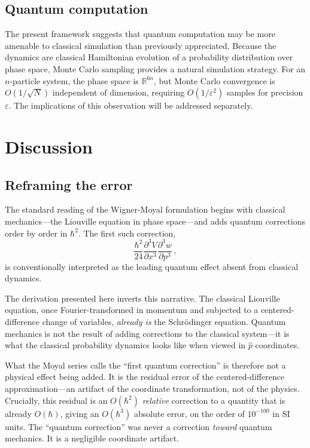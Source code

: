 \documentclass[prb,preprint]{revtex4-1}
\begin{document}
\subsection{Quantum computation}

The present framework suggests that quantum computation may be more amenable to classical simulation than previously appreciated.  Because the dynamics are classical Hamiltonian evolution of a probability distribution over phase space, Monte Carlo sampling provides a natural simulation strategy.  For an $n$-particle system, the phase space is $\mathbb{R}^{6n}$, but Monte Carlo convergence is $O(1/\sqrt{N})$ independent of dimension, requiring $O(1/\varepsilon^2)$ samples for precision $\varepsilon$.  The implications of this observation will be addressed separately.


\section{Discussion}

\subsection{Reframing the error}

The standard reading of the Wigner-Moyal formulation\cite{wigner1932,moyal1949} begins with classical mechanics---the Liouville equation in phase space---and adds quantum corrections order by order in $\hbar^2$.  The first such correction,
\begin{equation}\label{eq:moyal-correction}
\frac{\hbar^2}{24}\frac{\partial^3 V}{\partial x^3}\frac{\partial^3 w}{\partial p^3} \,,
\end{equation}
is conventionally interpreted as the leading quantum effect absent from classical dynamics.

The derivation presented here inverts this narrative.  The classical Liouville equation, once Fourier-transformed in momentum and subjected to a centered-difference change of variables, \emph{already is} the Schr\"odinger equation.  Quantum mechanics is not the result of adding corrections to the classical system---it is what the classical probability dynamics looks like when viewed in $\hat{p}$ coordinates.

What the Moyal series calls the ``first quantum correction'' is therefore not a physical effect being added.  It is the residual error of the centered-difference approximation---an artifact of the coordinate transformation, not of the physics.  Crucially, this residual is an $O(\hbar^2)$ \emph{relative} correction to a quantity that is already $O(\hbar)$, giving an $O(\hbar^3)$ absolute error, on the order of $10^{-100}$ in SI units.  The ``quantum correction'' was never a correction \emph{toward} quantum mechanics.  It is a negligible coordinate artifact.
\end{document}
